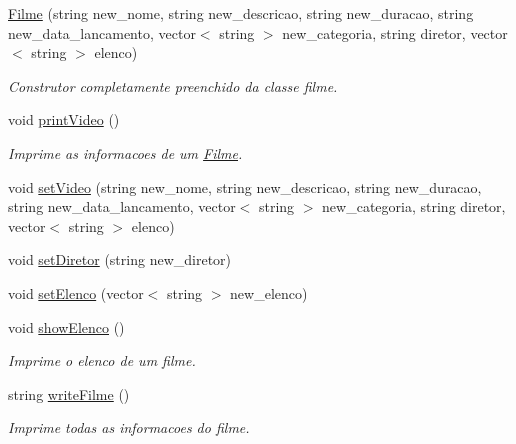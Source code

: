 \begin{DoxyCompactItemize}
\item 
\hyperlink{classFilme_a1ab5e0c3fc8acf1eaa1df40c537f8471}{Filme} (string new\+\_\+nome, string new\+\_\+descricao, string new\+\_\+duracao, string new\+\_\+data\+\_\+lancamento, vector$<$ string $>$ new\+\_\+categoria, string diretor, vector$<$ string $>$ elenco)\hypertarget{classFilme_a1ab5e0c3fc8acf1eaa1df40c537f8471}{}\label{classFilme_a1ab5e0c3fc8acf1eaa1df40c537f8471}

\begin{DoxyCompactList}\small\item\em Construtor completamente preenchido da classe filme. \end{DoxyCompactList}\item 
void \hyperlink{classFilme_a323818108234459c493f3ea1cbbee5c3}{print\+Video} ()\hypertarget{classFilme_a323818108234459c493f3ea1cbbee5c3}{}\label{classFilme_a323818108234459c493f3ea1cbbee5c3}

\begin{DoxyCompactList}\small\item\em Imprime as informacoes de um \hyperlink{classFilme}{Filme}. \end{DoxyCompactList}\item 
void \hyperlink{classFilme_a3ac64771d9e4ff7146f103033bae3a6b}{set\+Video} (string new\+\_\+nome, string new\+\_\+descricao, string new\+\_\+duracao, string new\+\_\+data\+\_\+lancamento, vector$<$ string $>$ new\+\_\+categoria, string diretor, vector$<$ string $>$ elenco)
\item 
void \hyperlink{classFilme_a3c7acd4e6e08075b8459b880f2aaa443}{set\+Diretor} (string new\+\_\+diretor)
\item 
void \hyperlink{classFilme_aacdbddfd340f794510102df0472c7ba2}{set\+Elenco} (vector$<$ string $>$ new\+\_\+elenco)
\item 
void \hyperlink{classFilme_a51a0a28043f0683d816973a54b152ec4}{show\+Elenco} ()\hypertarget{classFilme_a51a0a28043f0683d816973a54b152ec4}{}\label{classFilme_a51a0a28043f0683d816973a54b152ec4}

\begin{DoxyCompactList}\small\item\em Imprime o elenco de um filme. \end{DoxyCompactList}\item 
string \hyperlink{classFilme_ad98306c34f00ec7c30027454bdcbb982}{write\+Filme} ()\hypertarget{classFilme_ad98306c34f00ec7c30027454bdcbb982}{}\label{classFilme_ad98306c34f00ec7c30027454bdcbb982}

\begin{DoxyCompactList}\small\item\em Imprime todas as informacoes do filme. \end{DoxyCompactList}\end{DoxyCompactItemize}
